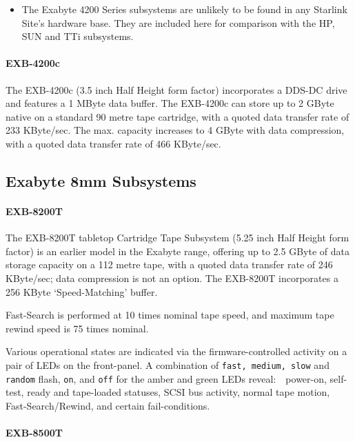 \begin {itemize}

\item[{\huge\bf -}] The Exabyte 4200 Series subsystems are unlikely to be found
in any Starlink Site's hardware base. They are included here for comparison with
the HP, SUN and TTi subsystems.

\end {itemize}

\paragraph {EXB-4200c}

The EXB-4200c (3.5 inch Half Height form factor) incorporates a DDS-DC drive
and features a 1 MByte data buffer. The EXB-4200c can store up to 2 GByte
native on a standard 90 metre tape cartridge, with a quoted data transfer
rate of 233 KByte/sec. The max. capacity increases to 4 GByte with data
compression, with a quoted data transfer rate of 466 KByte/sec.

\subsection {Exabyte 8mm Subsystems}

\paragraph {EXB-8200T}

The EXB-8200T tabletop Cartridge Tape Subsystem (5.25 inch Half Height form
factor) is an earlier model in the Exabyte range, offering up to 2.5 GByte
of data storage capacity on a 112 metre tape, with a quoted data transfer
rate of 246 KByte/sec; data compression is not an option. The EXB-8200T
incorporates a 256 KByte `Speed-Matching' buffer.

Fast-Search is performed at 10 times nominal tape speed, and maximum tape
rewind speed is 75 times nominal.

Various operational states are indicated via the firmware-controlled activity
on a pair of LEDs on the front-panel. A combination of {\tt fast, medium, slow}
and {\tt random} flash, {\tt on}, and {\tt off} for the amber and green
LEDs reveal:\ \ power-on, self-test, ready and tape-loaded statuses, SCSI bus
activity, normal tape motion, Fast-Search/Rewind, and certain fail-conditions.

\paragraph {EXB-8500T}

